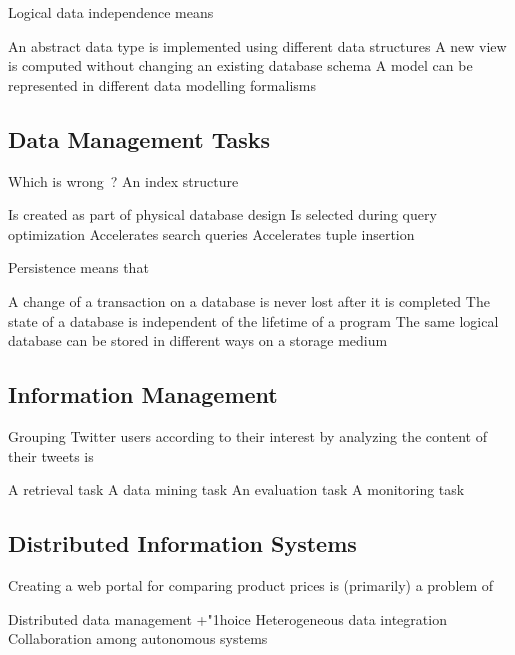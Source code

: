 \documentclass[12pt,a4paper,answers]{exam} %
\begin{document}
\begin{flushleft}
\begin{multicols*}{2}
\begin{questions}
\question Logical data independence means
\begin{checkboxes}
\choice An abstract data type is implemented using different data structures
\CorrectChoice A new view is computed without changing an existing database schema
\choice A model can be represented in different data modelling formalisms
\end{checkboxes}


\subsection{Data Management Tasks}

\question Which is wrong~? An index structure
\begin{checkboxes}
\choice Is created as part of physical database design
\choice Is selected during query optimization
\choice Accelerates search queries
\CorrectChoice Accelerates tuple insertion
\end{checkboxes}

\question Persistence means that
\begin{checkboxes}
\choice A change of a transaction on a database is never lost after it is completed
\CorrectChoice The state of a database is independent of the lifetime of a program
\choice The same logical database can be stored in different ways on a storage medium
\end{checkboxes}


\subsection{Information Management}

\question Grouping Twitter users according to their interest by analyzing the content of their tweets is
\begin{checkboxes}
\choice A retrieval task
\CorrectChoice A data mining task
\choice An evaluation task
\choice A monitoring task
\end{checkboxes}


\subsection{Distributed Information Systems}

\question Creating a web portal for comparing product prices is (primarily) a problem of
\begin{checkboxes}
\choice Distributed data management
\CorrectC+"1hoice Heterogeneous data integration
\choice Collaboration among autonomous systems
\end{checkboxes}



\end{questions}
\end{multicols*}
\end{flushleft}
\end{document}
